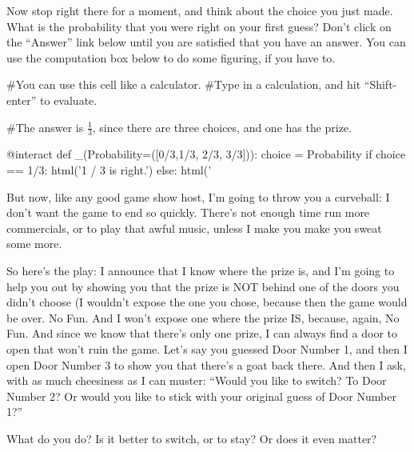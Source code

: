 Now stop right there for a moment, and think about the choice you just
made.  What is the probability that you were right on your first
guess?  Don't click on the ``Answer'' link below until you are
satisfied that you have an answer.  You can use the computation box
below to do some figuring, if you have to.


\begin{sageverbatim}
#You can use this cell like a calculator.  
#Type in a calculation, and hit ``Shift-enter'' to evaluate.
\end{sageverbatim}


\begin{sageverbatim}
#The answer is $\frac{1}{3}$, since there are three choices, and one
  has the prize.
\end{sageverbatim}

\begin{sageverbatim}
@interact
def _(Probability=([0/3,1/3, 2/3, 3/3])):
    choice = Probability
    if choice == 1/3:
         html('1 / 3 is right.')
    else:
         html('%
\end{sageverbatim}    





But now, like any good game show host, I'm going to throw you a
curveball: I don't want the game to end so quickly.  There's not
enough time run more commercials, or to play that awful music, unless
I make you make you sweat some more. 


So here's the play: I announce that I know where the prize is, and I'm
going to help you out by showing you that the prize is NOT behind one
of the doors you didn't choose (I wouldn't expose the one you chose,
because then the game would be over.  No Fun.  And I won't expose one
where the prize IS, because, again, No Fun. And since we know that
there's only one prize, I can always find a door to open that won't
ruin the game.  Let's say you guessed Door Number 1, and then I open
Door Number 3 to show you that there's a goat back there.  And then
I ask, with as much cheesiness as I can muster: ``Would you like to
switch?  To Door Number 2?  Or would you like to stick with your
original guess of Door Number 1?''


What do you do?  Is it better to switch, or to stay?  Or does it even
matter?


